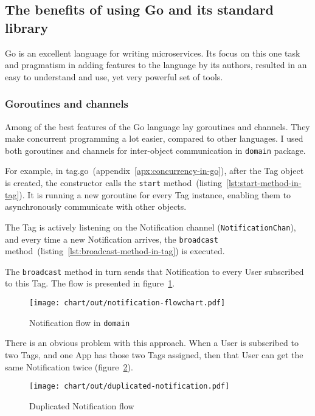 \subsection{The benefits of using Go and its standard library}\label{sec:the-benefits-of-using-go-and-its-standard-library}

Go is an excellent language for writing microservices.
Its focus on this one task
and pragmatism in adding features to the language by its authors,
resulted in an easy to understand and use,
yet very powerful set of tools.

\subsubsection{Goroutines and channels}\label{sec:goroutines-and-channels}

Among of the best features of the Go language lay goroutines and channels.
They make concurrent programming a lot easier, compared to other languages.
I used both goroutines and channels
for inter-object communication in \texttt{domain} package.

For example, in {tag.go}~(appendix~\ref{apx:concurrency-in-go}),
after the Tag object is created,
the constructor calls
the \texttt{start} method~(listing~\ref{lst:start-method-in-tag}).
It is running a new goroutine for every Tag instance,
enabling them to asynchronously communicate with other objects.

The Tag is actively listening
on the Notification channel (\texttt{NotificationChan}),
and every time a new Notification arrives,
the \texttt{broadcast} method~(listing~\ref{lst:broadcast-method-in-tag})
is executed.

The \texttt{broadcast} method in turn sends that Notification
to every User subscribed to this Tag.
The flow is presented in figure~\ref{fig:notification-flowchart}.

\begin{figure}[h]
  \centering
  \texttt{[image: chart/out/notification-flowchart.pdf]}
  \caption{Notification flow in \texttt{domain}}
  \label{fig:notification-flowchart}
\end{figure}

There is an obvious problem with this approach.
When a User is subscribed to two Tags,
and one App has those two Tags assigned,
then that User can get the same Notification twice
(figure~\ref{fig:duplicated-notification}).

\begin{figure}[h]
  \centering
  \texttt{[image: chart/out/duplicated-notification.pdf]}
  \caption{Duplicated Notification flow}
  \label{fig:duplicated-notification}
\end{figure}

